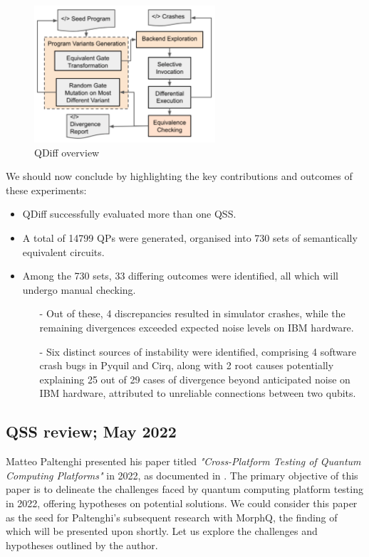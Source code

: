 \begin{itemize}
    \begin{figure}[H]
        \centering
        \includegraphics[width=0.6\textwidth]{TFM/photos/QDiffWorkoverflow.png}
        \caption{QDiff overview \cite{wang2021qdiff}} 
        \label{Fig:QDiffWorkOverflow}
    \end{figure}

    We should now conclude by highlighting the key contributions and outcomes of these experiments:

\begin{itemize}
    \item QDiff successfully evaluated more than one QSS.
    \item A total of 14799 QPs were generated, organised into 730 sets of semantically equivalent circuits.
    \item Among the 730 sets, 33 differing outcomes were identified, all which will undergo manual checking.
    \begin{itemize}
        \item[-] Out of these, 4 discrepancies resulted in simulator crashes, while the remaining divergences exceeded expected noise levels on IBM hardware.
        \item[-] Six distinct sources of instability were identified, comprising 4 software crash bugs in Pyquil and Cirq, along with 2 root causes potentially explaining 25 out of 29 cases of divergence beyond anticipated noise on IBM hardware, attributed to unreliable connections between two qubits.
    \end{itemize}
    
\end{itemize}

\vspace{15pt}
\subsection{QSS review; May 2022}
Matteo Paltenghi presented his paper titled \textit{"Cross-Platform Testing of Quantum Computing Platforms"} in 2022, as documented in \cite{paltenghi2022cross}. The primary objective of this paper is to delineate the challenges faced by quantum computing platform testing in 2022, offering hypotheses on potential solutions. We could consider this paper as the seed for Paltenghi's subsequent research with MorphQ, the finding of which will be presented upon shortly. Let us explore the challenges and hypotheses outlined by the author.


\end{itemize}
